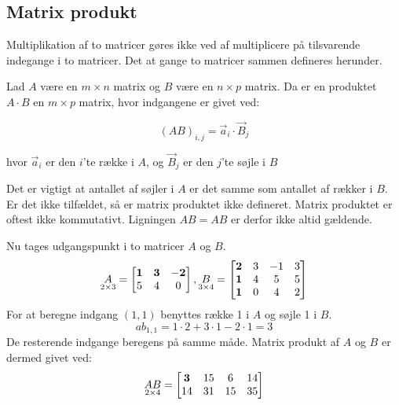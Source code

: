 \subsection{Matrix produkt}
Multiplikation af to matricer gøres ikke ved af multiplicere på tilsvarende indegange i to matricer. Det at gange to matricer sammen defineres herunder. 
\begin{defn} 
Lad $A$ være en $m \times n$ matrix og $B$ være en $n \times p$ matrix. Da er en produktet $A \cdot B$ en $m \times p$ matrix, hvor indgangene er givet ved: 

$$(AB)_{i,j} = \vec{a}_i \cdot \vec{B}_j$$

hvor $\vec{a}_i$ er den $i$'te række i $A$, og $\vec{B}_j$ er den $j$'te søjle i $B$
\label{def:(matrixprodukt)}
\end{defn}
Det er vigtigt at antallet af søjler i $A$ er det samme som antallet af rækker i $B$. Er det ikke tilfældet, så er matrix produktet ikke defineret. Matrix produktet er oftest ikke kommutativt. Ligningen $AB=AB$ er derfor ikke altid gældende. 
\begin{eks}
Nu tages udgangspunkt i to matricer $A$ og $B$. 
\begin{align*}
\underset{2 \times 3}{A}= \begin{bmatrix}
	\bf{1} & \bf{3} & \bf{-2} \\
	5 & 4 & 0 	
\end{bmatrix},
\underset{3 \times 4}{B}= \begin{bmatrix}
	\bf{2} & 3 & -1 & 3 \\
	\bf{1} & 4 & 5 & 5\\
	\bf{1} & 0 & 4 & 2
\end{bmatrix}  
\end{align*}
For at beregne indgang $(1,1)$ benyttes række 1 i $A$ og søjle 1 i $B$. 
$$ab_{1,1}=1\cdot 2+3\cdot 1-2 \cdot 1 = 3$$ 
De resterende indgange beregens på samme måde. 
Matrix produkt af $A$ og $B$ er dermed givet ved:
\begin{align*}
\underset{2 \times 4}{AB}= \begin{bmatrix}
	\bf{3} & 15 & 6 & 14 \\
	14 & 31 & 15 & 35
\end{bmatrix}  
\end{align*}
\end{eks}



